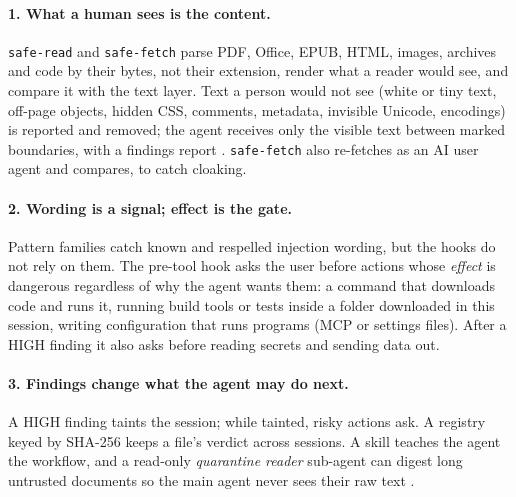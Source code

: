 \documentclass[11pt]{article}
\begin{document}
\paragraph{1. What a human sees is the content.} \texttt{safe-read} and \texttt{safe-fetch} parse PDF, Office, EPUB,
HTML, images, archives and code by their bytes, not their extension, render what a reader would see, and compare it
with the text layer. Text a person would not see (white or tiny text, off-page objects, hidden CSS, comments,
metadata, invisible Unicode, encodings) is reported and removed; the agent receives only the visible text between
marked boundaries, with a findings report \citep[cf.][]{hines2024spotlighting}. \texttt{safe-fetch} also re-fetches as an
AI user agent and compares, to catch cloaking.

\paragraph{2. Wording is a signal; effect is the gate.} Pattern families catch known and respelled injection
wording, but the hooks do not rely on them. The pre-tool hook asks the user before actions whose \emph{effect} is
dangerous regardless of why the agent wants them: a command that downloads code and runs it, running build tools or
tests inside a folder downloaded in this session, writing configuration that runs programs (MCP or settings files).
After a HIGH finding it also asks before reading secrets and sending data out.

\paragraph{3. Findings change what the agent may do next.} A HIGH finding taints the session; while tainted, risky
actions ask. A registry keyed by SHA-256 keeps a file's verdict across sessions. A skill teaches the agent the
workflow, and a read-only \emph{quarantine reader} sub-agent can digest long untrusted documents so the main agent
never sees their raw text \citep[the dual-model pattern of][]{beurerkellner2025patterns}.
\end{document}
